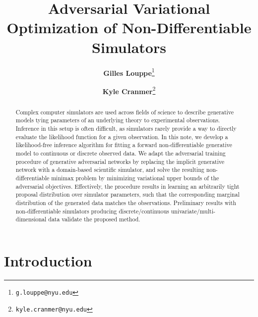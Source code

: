 \documentclass[twocolumn,superscriptaddress,aps]{revtex4-1}
\theoremstyle{plain}
\begin{document}

\title{\Large{Adversarial Variational Optimization of Non-Differentiable Simulators}}
\vspace{1cm}
\author{\small{\bf Gilles Louppe}\thanks{\texttt{g.louppe@nyu.edu}}}
\author{\small{\bf Kyle Cranmer}\thanks{\texttt{kyle.cranmer@nyu.edu}}}

\begin{abstract}

Complex computer simulators are used across fields of science to
describe generative models tying parameters of an underlying theory to
experimental observations. Inference in this setup is often
difficult, as simulators rarely provide a way to directly evaluate the likelihood
function for a given observation. In this note, we develop a likelihood-free
inference algorithm for fitting a forward non-differentiable generative model to
continuous or discrete observed data. We adapt the adversarial training procedure of generative
adversarial networks by replacing the implicit generative network with a
domain-based scientific simulator, and solve the resulting non-differentiable
minimax problem by minimizing variational upper bounds of the adversarial objectives.
Effectively, the procedure results in learning an arbitrarily tight
proposal distribution over simulator parameters, such that the corresponding
marginal distribution of the generated data matches the observations.
Preliminary results with non-differentiable simulators producing discrete/continuous univariate/multi-dimensional data
validate the proposed method.


\end{abstract}

\maketitle


\section{Introduction}
\end{document}
